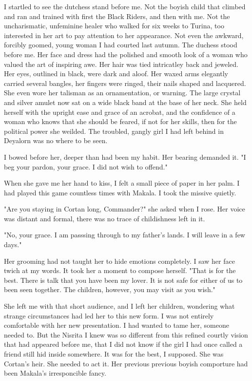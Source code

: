 \documentclass{article}
\begin{document}
I startled to see the dutchess stand before me. Not the boyish child that climbed and ran and trained with first the Black Riders, and then with me. Not the uncharismatic, unfeminine healer who walked for six weeks to Turina, too interested in her art to pay attention to her appearance. Not even the awkward, forcibly goomed, young woman I had courted last autumn. The duchess stood before me. Her face and dress had the polished and smooth look of a woman who valued the art of inspiring awe. Her hair was tied intricatley back and jeweled. Her eyes, outlined in black, were dark and aloof. Her waxed arms elegantly carried several bangles, her fingers were ringed, their nails shaped and lacquered. She even wore her talisman as an ornamentation, or warning. The large crystal and silver amulet now sat on a wide black band at the base of her neck.  She held herself with the upright ease and grace of an acrobat, and the confidence of a woman who knows that she should be feared, if not for her skills, then for the political power she weilded. The troubled, gangly girl I had left behind in Deyalorn was no where to be seen.

I bowed before her, deeper than had been my habit. Her bearing demanded it. "I beg your pardon, your grace. I did not wish to offend."

When she gave me her hand to kiss, I felt a small piece of paper in her palm. I had played this game countless times with Makala. I took the missive quietly. 

"Are you staying in Cortan long, Commander?" she asked when I rose. Her voice was distant and formal, there was no trace of childishness left in it.

"No, your grace. I am passsing through to my father's lands. I will leave in a few days."

Her grooming had not taught her to hide emotions completely. I saw her face twich at my words. It took her a moment to compose herself. "That is for the best. There is talk that you have been my lover. It is not safe for either of us to been seen together. The children, however, you may visit as you wish."

She left me with that short audience, and I left her children, wondering what strange circumstances had led her to this new form. I was not entirely comfortable with her new presentation. I had wanted to tame her, someone needed to. But the Nisrita I knew was so different from this refined courtly vision that had appeared before me, that I did not know if the girl I had once called a friend still hid inside somewhere. It was for the best, I supposed. She was Cortan's heir. She needed to act it. Her previous previous boyish comporture had been Makala's irresponcible fancy.
\end{document}
